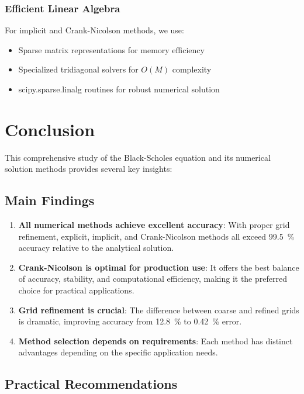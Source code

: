 \documentclass[12pt,a4paper]{article}
\numberwithin{algorithm}{subsection}
\begin{document}
\subsubsection{Efficient Linear Algebra}

For implicit and Crank-Nicolson methods, we use:
\begin{itemize}
\item Sparse matrix representations for memory efficiency
\item Specialized tridiagonal solvers for $O(M)$ complexity
\item scipy.sparse.linalg routines for robust numerical solution
\end{itemize}

\section{Conclusion}

This comprehensive study of the Black-Scholes equation and its numerical solution methods provides several key insights:

\subsection{Main Findings}

\begin{enumerate}
\item \textbf{All numerical methods achieve excellent accuracy}: With proper grid refinement, explicit, implicit, and Crank-Nicolson methods all exceed \SI{99.5}{\percent} accuracy relative to the analytical solution.

\item \textbf{Crank-Nicolson is optimal for production use}: It offers the best balance of accuracy, stability, and computational efficiency, making it the preferred choice for practical applications.

\item \textbf{Grid refinement is crucial}: The difference between coarse and refined grids is dramatic, improving accuracy from \SI{12.8}{\percent} to \SI{0.42}{\percent} error.

\item \textbf{Method selection depends on requirements}: Each method has distinct advantages depending on the specific application needs.
\end{enumerate}

\subsection{Practical Recommendations}
\end{document}
